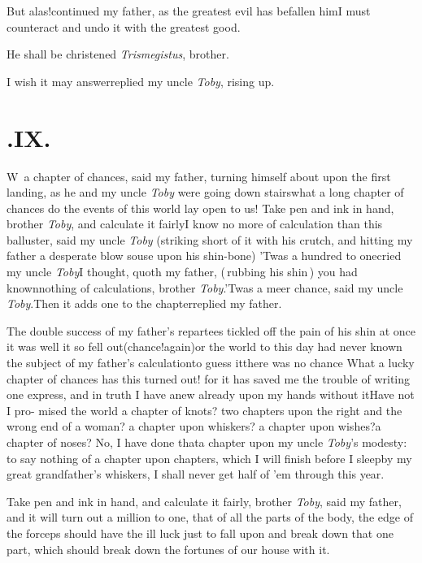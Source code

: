 \documentclass{article}
\begin{document}
But alas!\@ continued my father, as the greatest evil has befallen him\tsh I must
counteract and undo it with the greatest good.

He shall be christened \textit{Trismegistus}, brother.

I wish it may answer\tsh replied my uncle \textit{Toby}, rising up.

\smallskip
\section{.\enspace IX.}

\lettrine{W}{\,} a chapter of chances, said my father, turning himself about upon the
first landing, as he and my uncle \textit{Toby} were going
down stairs\tsh what a long
chapter of chances do the
events of this world lay open to us!\break
Take pen and ink in hand, brother \textit{Toby}, and
calculate it fairly\tsk I know no more of calculation than
this balluster, said my uncle \textit{Toby} (striking short
of it with his crutch, and hitting my father a desperate
blow souse upon his shin-bone)\tsk\break
’Twas a hundred to one\tsk cried my uncle \textit{Toby}\tsh I thought, quoth my
father, (\,rubbing his shin\,) you had known\break nothing of
calculations, brother \textit{Toby}.\break \tsk ’Twas a meer chance,
said my uncle \textit{Toby}.\tsk Then it adds one to the
chapter\break\tsk replied my father.

The double success of my father’s re\-partees tickled off the pain of his shin at once
\tsk it was well it so fell out\tsk (chance!\@ again)\tsk or the world to this day had never
known the subject of my father’s calculation\tsk to guess
it\tsk there was no chance\tsk
What a lucky chapter of chances has this turned out! for it
has saved me the trouble of writing one express, and in
truth I have anew already upon my hands without it\tsh Have
not I pro-\break 
mised the world a chapter of knots?\break
two chapters upon the right and the\break
wrong end of a woman? a chapter upon\break
whiskers? a chapter upon wishes?\tsk a chapter of noses?\tsk
No, I have done that\tsk a chapter upon my uncle
\textit{Toby}’s modesty: to say nothing of a chapter upon
chapters, which I will finish before I sleep\tsk by my great
grandfather’s whiskers, I shall never get half of ’em
through this year.

Take pen and ink in hand, and calculate it fairly, brother
\textit{Toby}, said my father, and it will turn out a
million to one, that of all the parts of the body, the edge
of the forceps should have the ill luck just to fall upon
and break down that one part, which should break down the
fortunes of our house with it.
\end{document}
